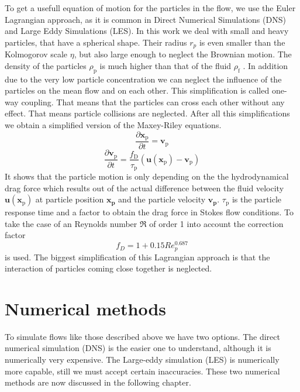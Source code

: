 \documentclass[a4paper,10pt]{article}
\renewcommand*\vec[1]{\boldsymbol{#1}}
\numberwithin{equation}{section} %
\begin{document}
To get a usefull equation of motion for the particles in the flow, we use the Euler Lagrangian approach, as it is common in Direct Numerical Simulations (DNS) and Large Eddy Simulations (LES).
In this work we deal with small and heavy particles, that have a spherical shape. Their radius $ r_p $ is even smaller than the Kolmogorov scale $ \eta $, but also large enough to neglect the Brownian motion. The density of the particles $ \rho_\mathrm{p} $ is much higher than that of the fluid $ \rho_\mathrm{f} $ . In addition due to the very low particle concentration we can neglect the influence of the particles on the mean flow and on each other. This simplification is called one-way coupling. That means that the particles can cross each other without any effect. That means particle collisions are neglected.
After all this simplifications we obtain a simplified version of the Maxey-Riley equations. 
\begin{equation}
 \frac{\partial{\vec{x_\mathrm{p}}}}{\partial{t}} = \vec{v_\mathrm{p}}
\end{equation}
\nomenclature{$\vec{x_\mathrm{p}}$}{Particle position}
\nomenclature{$\vec{v_\mathrm{p}}$}{Particle velocity}
\begin{equation}
 \frac{\partial{\vec{v_\mathrm{p}}}}{\partial{t}} = \frac{f_\mathrm{D}}{\tau_\mathrm{p}} (\vec{u(x_\mathrm{p})} - \vec{v_\mathrm{p}})
 \end{equation}
 It shows that the particle motion is only depending on the the hydrodynamical drag force which results out of the actual difference between the fluid velocity $\vec{u(x_\mathrm{p})}$ at particle position $\vec{x_p}$ and the particle velocity $\vec{v_p}$.
 $\tau_\mathrm{p}$ is the particle response time and a factor to obtain the drag force in Stokes flow conditions.
 To take the case of an Reynolds number $\Re$ of order 1 into account the correction factor 
 \begin{equation}
 f_D = 1 + 0.15 Re_p^\mathrm{0.687} 
 \end{equation}
 is used.
The biggest simplification of this Lagrangian approach is that the interaction of particles coming close together is neglected.
\pagebreak
\section{Numerical methods} %
To simulate flows like those described above we have two options. The direct numerical simulation (DNS) is the easier one to understand, although it is numerically very expensive. The Large-eddy simulation (LES) is numerically more capable, still we must accept certain inaccuracies. These two numerical methods are now discussed in the following chapter.
\end{document}
